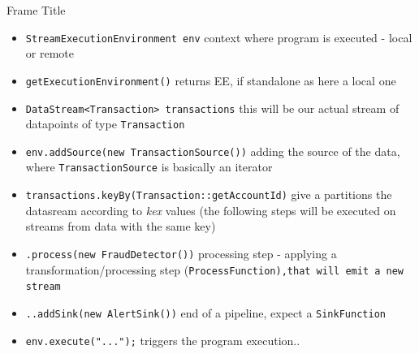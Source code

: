 \documentclass[blue]{beamer}
\begin{document}
\begin{frame}[fragile]{Frame Title}



    
 
    

        

        

        

        

\tiny{

\begin{itemize}
    \item {\tt StreamExecutionEnvironment env} context where program is executed - local or remote
    \item {\tt getExecutionEnvironment()} returns EE, if standalone as here a local one
    \item {\tt DataStream<Transaction> transactions} this will be our actual stream of datapoints of type {\tt Transaction}
    \item {\tt env.addSource(new TransactionSource())}  adding the source of the data, where {\tt TransactionSource} is basically an iterator
    \item {\tt transactions.keyBy(Transaction::getAccountId)} give a     partitions the datasream according to \textit{kex} values (the following steps will be executed on streams from data with the same key)
    \item {\tt .process(new FraudDetector())} processing step - applying a transformation/processing step (\tt ProcessFunction),that will emit a new stream 
    \item {\tt ..addSink(new AlertSink())} end of a pipeline, expect a {\tt SinkFunction}
    
    \item {\tt env.execute("...");} triggers the program execution..
\end{itemize}
}

\end{frame}
\end{document}
